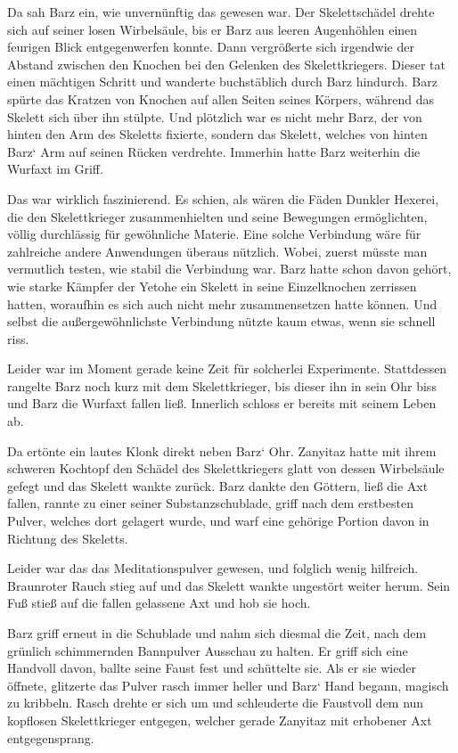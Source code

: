 Da sah Barz ein, wie unvernünftig das gewesen war. Der Skelettschädel drehte sich auf seiner losen Wirbelsäule, bis er Barz aus leeren Augenhöhlen einen feurigen Blick entgegenwerfen konnte. Dann vergrößerte sich irgendwie der Abstand zwischen den Knochen bei den Gelenken des Skelettkriegers. Dieser tat einen mächtigen Schritt und wanderte buchstäblich durch Barz hindurch. Barz spürte das Kratzen von Knochen auf allen Seiten seines Körpers, während das Skelett sich über ihn stülpte. Und plötzlich war es nicht mehr Barz, der von hinten den Arm des Skeletts fixierte, sondern das Skelett, welches von hinten Barz‘ Arm auf seinen Rücken verdrehte. Immerhin hatte Barz weiterhin die Wurfaxt im Griff.

Das war wirklich faszinierend. Es schien, als wären die Fäden Dunkler Hexerei, die den Skelettkrieger zusammenhielten und seine Bewegungen ermöglichten, völlig durchlässig für gewöhnliche Materie. Eine solche Verbindung wäre für zahlreiche andere Anwendungen überaus nützlich. Wobei, zuerst müsste man vermutlich testen, wie stabil die Verbindung war. Barz hatte schon davon gehört, wie starke Kämpfer der Yetohe ein Skelett in seine Einzelknochen zerrissen hatten, woraufhin es sich auch nicht mehr zusammensetzen hatte können. Und selbst die außergewöhnlichste Verbindung nützte kaum etwas, wenn sie schnell riss.

Leider war im Moment gerade keine Zeit für solcherlei Experimente. Stattdessen rangelte Barz noch kurz mit dem Skelettkrieger, bis dieser ihn in sein Ohr biss und Barz die Wurfaxt fallen ließ. Innerlich schloss er bereits mit seinem Leben ab.

Da ertönte ein lautes Klonk direkt neben Barz‘ Ohr. Zanyitaz hatte mit ihrem schweren Kochtopf den Schädel des Skelettkriegers glatt von dessen Wirbelsäule gefegt und das Skelett wankte zurück. Barz dankte den Göttern, ließ die Axt fallen, rannte zu einer seiner Substanzschublade, griff nach dem erstbesten Pulver, welches dort gelagert wurde, und warf eine gehörige Portion davon in Richtung des Skeletts.

Leider war das das Meditationspulver gewesen, und folglich wenig hilfreich. Braunroter Rauch stieg auf und das Skelett wankte ungestört weiter herum. Sein Fuß stieß auf die fallen gelassene Axt und hob sie hoch.

Barz griff erneut in die Schublade und nahm sich diesmal die Zeit, nach dem grünlich schimmernden Bannpulver Ausschau zu halten. Er griff sich eine Handvoll davon, ballte seine Faust fest und schüttelte sie. Als er sie wieder öffnete, glitzerte das Pulver rasch immer heller und Barz‘ Hand begann, magisch zu kribbeln. Rasch drehte er sich um und schleuderte die Faustvoll dem nun kopflosen Skelettkrieger entgegen, welcher gerade Zanyitaz mit erhobener Axt entgegensprang.

